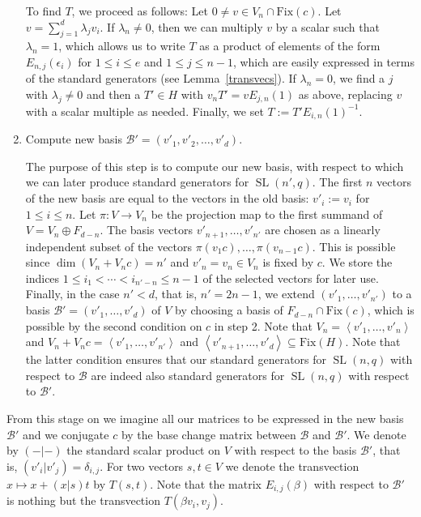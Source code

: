 \documentclass[a4paper,11pt]{article}
\def\SL{\operatorname{SL}}
\newcommand{\Fix}[1]{\mathrm{Fix}(#1)}
\newcommand{\B}{\mathcal{B}}
\begin{document}
\begin{enumerate}
To find $T$, we proceed as follows: Let $0 \neq v \in V_n \cap \Fix c$.
Let $v = \sum_{j=1}^d \lambda_j v_i$. If $\lambda_n \neq 0$, 
then we can multiply $v$ by a scalar such that
$\lambda_n = 1$, which allows us to write $T$ as a product of
elements of the form $E_{n,j}(\epsilon_i)$ for $1 \le i \le e$
and $1 \le j \le n-1$, which are easily expressed in terms of the
standard generators (see Lemma~\ref{transvecs}).
If $\lambda_n = 0$, we find a $j$ with $\lambda_j \neq 0$ and
then a $T' \in H$ with $v_n T' = vE_{j,n}(1)$ as above,
replacing $v$ with a scalar multiple as needed. Finally, we set
$T := T' E_{i,n}(1)^{-1}$.
\item Compute new basis $\B' = (v'_1,v'_2,\ldots,v'_d)$.

The purpose of this step is to compute our new basis, with respect to
which we can later produce standard generators for $\SL(n',q)$.
The first $n$ vectors of the new basis are equal to the vectors in
the old basis: $v'_i := v_i$ for $1 \le i \le n$.
Let $\pi: V \to V_n$ be the projection map to the first summand of
$V = V_n \oplus F_{d-n}$. The basis vectors
$v'_{n+1}, \ldots, v'_{n'}$ are chosen as a linearly independent subset
of the vectors $\pi(v_1c), \ldots, \pi(v_{n-1}c)$. This is possible
since $\dim(V_n + V_n c) = n'$ and $v'_n=v_n \in V_n$ is fixed by $c$.
We store the indices $1 \le i_1 < \cdots < i_{n'-n} \le n-1$ of the
selected vectors for later use. Finally, in the case $n' < d$, that is,
$n'=2n-1$, we extend $(v'_1, \ldots, v'_{n'})$ to a basis $\B' = (v'_1,
\ldots, v'_d)$ of $V$ by choosing a basis of $F_{d-n} \cap \Fix c$, which
is possible by the second condition on $c$ in step 2. Note that $V_n =
\left< v'_1, \ldots, v'_n\right>$ and $V_n + V_nc = \left< v'_1, \ldots,
v'_{n'}\right>$ and $\left< v'_{n+1}, \ldots, v'_d\right> \subseteq \Fix
H$. Note that the latter condition ensures that our standard generators
for $\SL(n,q)$ with respect to $\B$ are indeed also standard generators
for $\SL(n,q)$ with respect to $\B'$.
\end{enumerate}

\noindent
From this stage on we imagine all our matrices to be expressed in the
new basis $\B'$ and we conjugate $c$ by the base change matrix between
$\B$ and $\B'$. We denote by $(-|-)$ the standard scalar product on $V$
with respect to the basis $\B'$, that is, $(v'_i|v'_j) = \delta_{i,j}$.
For two vectors $s,t \in V$ we denote the transvection $x \mapsto x +
(x|s)t$ by $T(s,t)$. Note that the matrix $E_{i,j}(\beta)$ with respect
to $\B'$ is nothing but the transvection $T(\beta v_i,v_j)$.
\end{document}

